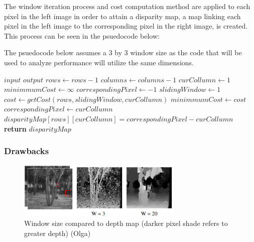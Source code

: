 \documentclass[11pt]{scrartcl}
\begin{document}
The window iteration process and cost computation method are applied to each pixel in the 
left image in order to attain a disparity map, a map linking each pixel in the left image 
to the corresponding pixel in the right image, is created. This process can be seen in the 
psuedocode below:
\begin{remark}
    The psuedocode below assumes a 3 by 3 window size as the code that will 
    be used to analyze performance will utilize the same dimensions. 
\end{remark}
\begin{algorithm}[!htb]
    \algrenewcommand{}
    \algrenewcommand{}
    \caption{}
    \label{alg:}
    \begin{algorithmic}[1]
        \Require $input$
        \Ensure $output$ 
        \State $rows \gets rows-1$
        \State $columns \gets columns-1$
            \State $curCollumn \gets 1$
                \State $minimmumCost \gets \infty$
                \State $correspondingPixel \gets -1$
                \State $slidingWindow \gets 1$
                      \State $cost \gets getCost(rows, slidingWindow, curCollumn)$
                         \State $minimmumCost \gets cost$
                         \State $correspondingPixel \gets curCollumn$
                      \EndIf
                \EndWhile
            \EndWhile 
            \State $disparityMap[rows][curCollumn] = correspondingPixel - curCollumn$
        \EndWhile
        \State \textbf{return} $disparityMap$
    \end{algorithmic}
\end{algorithm}

\subsubsection{Drawbacks}
\begin{figure}
  \includegraphics[width=0.7\textwidth]{winsize.png}
    \caption{\label{fig:frog1} Window size compared to depth map (darker pixel shade refers to greater depth) (Olga)}

\end{figure}
\end{document}
